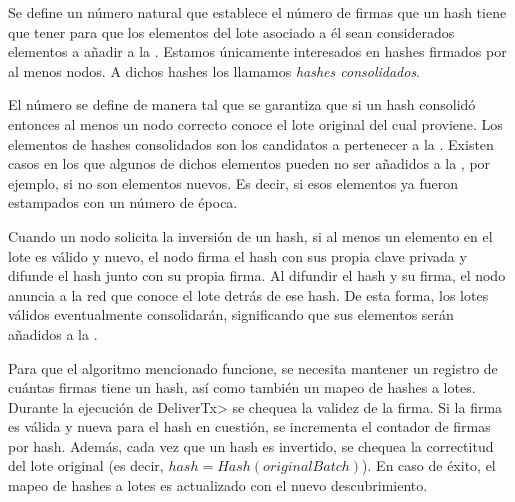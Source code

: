 %
Se define un número natural \SPH que establece
el número de firmas que un hash tiene que tener para que los elementos del lote asociado a él
sean considerados elementos a añadir a la \setchain.
%
Estamos únicamente interesados en hashes firmados por al menos \SPH
nodos. A dichos hashes los llamamos \textit{hashes consolidados}.

El número \SPH se define de manera tal que se garantiza que si un hash
consolidó entonces al menos un nodo correcto conoce el lote original del cual proviene.
%
Los elementos de hashes consolidados son los candidatos a pertenecer a la \setchain.
%
Existen casos en los que algunos de dichos elementos pueden no ser añadidos a la \setchain,
por ejemplo, si no son elementos nuevos.
Es decir, si esos elementos ya fueron estampados con un número de época.

%
Cuando un nodo solicita la inversión de un hash, si al menos un elemento en el lote
es válido y nuevo, el nodo firma el hash con sus propia clave privada y difunde el hash junto
con su propia firma.
%
Al difundir el hash y su firma, el nodo anuncia a la red que conoce el lote detrás de ese hash.
%
De esta forma, los lotes válidos eventualmente consolidarán, significando que sus elementos
serán añadidos a la \setchain.

Para que el algoritmo mencionado funcione, se necesita mantener un registro de cuántas firmas tiene un hash,
así como también un mapeo de hashes a lotes.
%
Durante la ejecución de \<DeliverTx> se chequea la validez de la firma.
%
Si la firma es válida y nueva para el hash en cuestión, se incrementa el contador de
firmas por hash.
%
Además, cada vez que un hash es invertido, se chequea la correctitud del lote original
(es decir, $hash = Hash(originalBatch)$). En caso de éxito, el mapeo de hashes a lotes
es actualizado con el nuevo descubrimiento.

%


%



